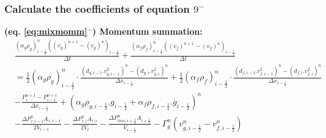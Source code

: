 \documentclass[11pt,letterpaper,titlepage]{article}
\newcommand{\half}{\frac{1}{2}}
\begin{document}
\subsubsection{Calculate the coefficients of equation $9^-$}
\textbf{(eq. \ref{eq:mixmomm}$^-$) Momentum summation:}
\begin{equation*}
\begin{aligned}
&\frac{(\alpha_g\rho_g )_{i-\half}^{n} ((v_g)^{n+1}-(v_g)^{n})_{i-\half}}{\Delta t}
+\frac{(\alpha_f\rho_f )_{i-\half}^{n} ((v_f)^{n+1}-(v_f)^{n})_{i-\half}}{\Delta t}\\
&=\half (\alpha_g \rho_{g})_{i-\half}^n \cdot\frac{(d_{g,i-1}.v_{g,i-1}^2)^n-(d_{g,i}.v_{g,i}^2)^n}{\Delta x_{i-\half}} 
+\half (\alpha_f \rho_{f})_{i-\half}^n \cdot\frac{(d_{f,i-1}.v_{f,i-1}^2)^n-(d_{f,i}.v_{f,i}^2)^n}{\Delta x_{i-\half}} \\
&-\frac{P_{i}^{n+1}-P_{i-1}^{n+1}}{\Delta x_{i-\half}} + (\alpha_g \rho_{g,i-\half}.g_{i-\half} + \alpha_f\rho_{f,i-\half}.g_{i-\half})^n\\
&-\frac{\Delta P_{\tau,i-1}^n A_{\tau,i-1}}{2V_{i-1}}-\frac{\Delta P_{\tau,i}^n A_{\tau,i}}{2V_{i}} 
-\frac{\Delta P_{loss,i+\half}^n A_{i+\half}}{V_{i-\half}} - \Gamma_g^n (v_{g,i-\half}^n - v_{f,i-\half}^n)
\end{aligned}
\end{equation*}
\newline

\end{document}
